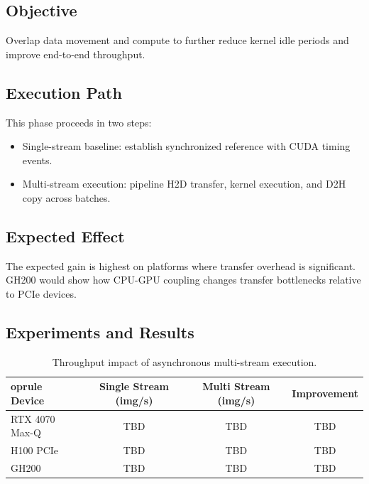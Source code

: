 \subsection{Objective}
Overlap data movement and compute to further reduce kernel idle periods and improve end-to-end throughput.

\subsection{Execution Path}
This phase proceeds in two steps:
\begin{itemize}
    \item Single-stream baseline: establish synchronized reference with CUDA timing events.
    \item Multi-stream execution: pipeline H2D transfer, kernel execution, and D2H copy across batches.
\end{itemize}

\subsection{Expected Effect}
The expected gain is highest on platforms where transfer overhead is significant. GH200 would show how CPU-GPU coupling changes transfer bottlenecks relative to PCIe devices.

\subsection{Experiments and Results}
\begin{table}[H]
\centering
\begin{tabular}{lccc}
	oprule
Device & Single Stream (img/s) & Multi Stream (img/s) & Improvement \\
\midrule
RTX 4070 Max-Q & TBD & TBD & TBD \\
H100 PCIe & TBD & TBD & TBD \\
GH200 & TBD & TBD & TBD \\
\bottomrule
\end{tabular}
\caption{Throughput impact of asynchronous multi-stream execution.}
\end{table}




